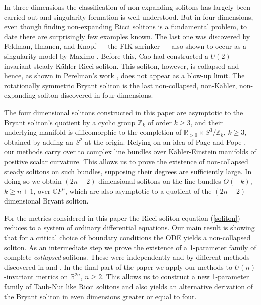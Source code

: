 \documentclass{amsart}
\theoremstyle{definition}
\theoremstyle{remark}
\numberwithin{equation}{section}
\newcommand{\R}{\mathbb{R}}  %
\begin{document}
In three dimensions the classification of non-expanding solitons has largely been carried out and singularity formation is well-understood. But in four dimensions, even though finding non-expanding Ricci solitons is a fundamental problem, to date there are surprisingly few examples known. The last one was discovered by Feldman, Ilmanen, and Knopf \cite{FIK03} --- the FIK shrinker --- also shown to occur as a singularity model by Maximo \cite{M14}. Before this, Cao \cite{Cao96} had constructed a $U(2)$-invariant steady K\"ahler-Ricci soliton. This soliton, however, is collapsed and hence, as shown in Perelman's work \cite{Perl08}, does not appear as a blow-up limit. The rotationally symmetric Bryant soliton \cite{B05} is the last non-collapsed, non-K\"ahler, non-expanding soliton discovered in four dimensions. 

The four dimensional solitons constructed in this paper are asymptotic to the Bryant soliton's quotient by a cyclic group $\mathbb{Z}_k$ of order $k \geq 3$, and their underlying manifold is diffeomorphic to the completion of $\mathbb{R}_{>0} \times S^3/\mathbb{Z}_k$, $k\geq 3$, obtained by adding an $S^2$ at the origin.  Relying on an idea of Page and Pope \cite{PP87}, our methods carry over to complex line bundles over K\"ahler-Einstein manifolds of positive scalar curvature. This allows us to prove the existence of non-collapsed steady solitons on such bundles, supposing their degrees are sufficiently large. In doing so we obtain $(2n+2)$-dimensional solitons on the line bundles $O(-k)$, $k\geq n+1$, over $\mathbb{C}P^n$, which are also asymptotic to a quotient of the $(2n+2)$-dimensional Bryant soliton.

For the metrics considered in this paper the Ricci soliton equation (\ref{soliton}) reduces to a system of ordinary differential equations. Our main result is showing that for a critical choice of boundary conditions the ODE yields a non-collapsed soliton. As an intermediate step we prove the existence of a 1-parameter family of complete \emph{collapsed} solitons. These were independently and by different methods discovered in \cite{Wink17} and \cite{Stol17}. In the final part of the paper we apply our methods to $U(n)$-invariant metrics on $\R^{2n}$, $n\geq2$. This allows us to construct a new 1-parameter family of Taub-Nut like Ricci solitons and also yields an alternative derivation of the Bryant soliton in even dimensions greater or equal to four. 
\end{document}
